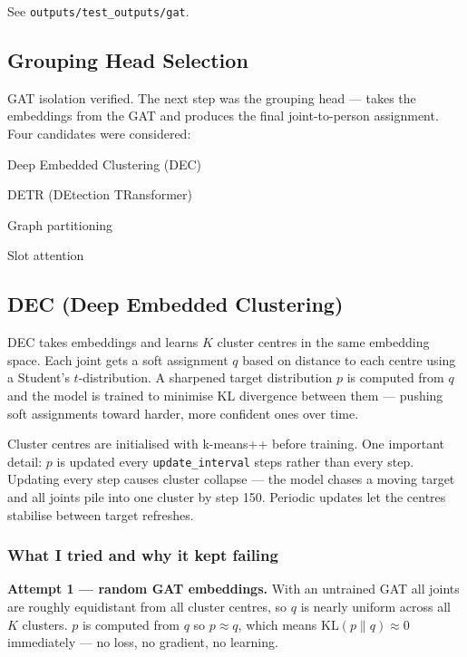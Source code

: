 See \texttt{outputs/test\_outputs/gat}.


\subsection{Grouping Head Selection}

GAT isolation verified. The next step was the grouping head --- takes the embeddings from the GAT and produces the final joint-to-person assignment. Four candidates were considered:

\begin{compactitem}
  \item Deep Embedded Clustering (DEC)
  \item DETR (DEtection TRansformer)
  \item Graph partitioning
  \item Slot attention
\end{compactitem}


\subsection{DEC (Deep Embedded Clustering)}

DEC takes embeddings and learns $K$ cluster centres in the same embedding space. Each joint gets a soft assignment $q$ based on distance to each centre using a Student's $t$-distribution. A sharpened target distribution $p$ is computed from $q$ and the model is trained to minimise KL divergence between them --- pushing soft assignments toward harder, more confident ones over time.

Cluster centres are initialised with k-means++ before training. One important detail: $p$ is updated every \texttt{update\_interval} steps rather than every step. Updating every step causes cluster collapse --- the model chases a moving target and all joints pile into one cluster by step 150. Periodic updates let the centres stabilise between target refreshes.


\subsubsection{What I tried and why it kept failing}

\textbf{Attempt 1 --- random GAT embeddings.}
With an untrained GAT all joints are roughly equidistant from all cluster centres, so $q$ is nearly uniform across all $K$ clusters. $p$ is computed from $q$ so $p \approx q$, which means $\text{KL}(p \| q) \approx 0$ immediately --- no loss, no gradient, no learning.

